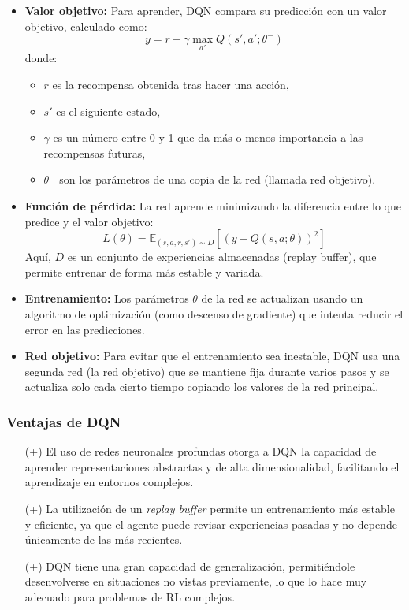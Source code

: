 \begin{itemize}
    \item \textbf{Valor objetivo:} Para aprender, DQN compara su predicción con un valor objetivo,
    calculado como:
    \[
    y = r + \gamma \max_{a'} Q(s', a'; \theta^-)
    \]
    donde:
    \begin{itemize}
        \item \( r \) es la recompensa obtenida tras hacer una acción,
        \item \( s' \) es el siguiente estado,
        \item \( \gamma \) es un número entre 0 y 1 que da más o menos importancia a las recompensas 
        futuras,
        \item \( \theta^- \) son los parámetros de una copia de la red (llamada red objetivo).
    \end{itemize}

    \item \textbf{Función de pérdida:} La red aprende minimizando la diferencia entre lo que predice 
    y el valor objetivo:
    \[
    L(\theta) = \mathbb{E}_{(s, a, r, s') \sim D} \left[ \left( y - Q(s, a; \theta) \right)^2 \right]
    \]
    Aquí, \( D \) es un conjunto de experiencias almacenadas (replay buffer), que permite entrenar de 
    forma más estable y variada.

    \item \textbf{Entrenamiento:} Los parámetros \( \theta \) de la red se actualizan usando un 
    algoritmo de optimización (como descenso de gradiente) que intenta reducir el error en las 
    predicciones.

    \item \textbf{Red objetivo:} Para evitar que el entrenamiento sea inestable, DQN usa una segunda 
    red (la red objetivo) que se mantiene fija durante varios pasos y se actualiza solo cada cierto 
    tiempo copiando los valores de la red principal.
\end{itemize}

\subsubsection{Ventajas de DQN \cite{dhumne2019dqn}}
\begin{itemize}
    \item[(+)] El uso de redes neuronales profundas otorga a DQN la capacidad de aprender 
    representaciones abstractas y de alta dimensionalidad, facilitando el aprendizaje en entornos 
    complejos.
    \item[(+)] La utilización de un \textit{replay buffer} permite un entrenamiento más estable y 
    eficiente, ya que el agente puede revisar experiencias pasadas y no depende únicamente de las 
    más recientes.
    \item[(+)] DQN tiene una gran capacidad de generalización, permitiéndole desenvolverse en 
    situaciones no vistas previamente, lo que lo hace muy adecuado para problemas de RL complejos.
\end{itemize}

